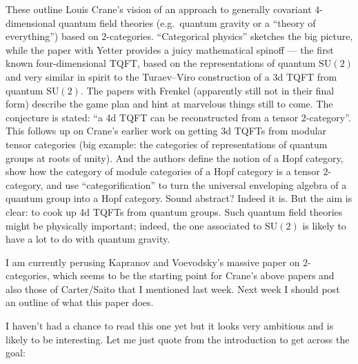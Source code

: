 \documentclass{article}
\def\tightlist{}
\renewcommand{\texttt}[1]{%
  \begingroup
  \ttfamily
  \begingroup\lccode`~=`/\lowercase{\endgroup\def~}{/\discretionary{}{}{}}%
  \begingroup\lccode`~=`[\lowercase{\endgroup\def~}{[\discretionary{}{}{}}%
  \begingroup\lccode`~=`.\lowercase{\endgroup\def~}{.\discretionary{}{}{}}%
  \catcode`/=\active\catcode`[=\active\catcode`.=\active
  \scantokens{#1\noexpand}%
  \endgroup
}
\begin{document}
These outline Louis Crane's vision of an approach to generally covariant
\(4\)-dimensional quantum field theories (e.g.~quantum gravity or a
``theory of everything'') based on \(2\)-categories. ``Categorical
physics'' sketches the big picture, while the paper with Yetter provides
a juicy mathematical spinoff --- the first known four-dimensional TQFT,
based on the representations of quantum \(\mathrm{SU}(2)\) and very
similar in spirit to the Turaev--Viro construction of a 3d TQFT from
quantum \(\mathrm{SU}(2)\). The papers with Frenkel (apparently still
not in their final form) describe the game plan and hint at marvelous
things still to come. The conjecture is stated: ``a 4d TQFT can be
reconstructed from a tensor \(2\)-category''. This follows up on Crane's
earlier work on getting 3d TQFTs from modular tensor categories (big
example: the categories of representations of quantum groups at roots of
unity). And the authors define the notion of a Hopf category, show how
the category of module categories of a Hopf category is a tensor
\(2\)-category, and use ``categorification'' to turn the universal
enveloping algebra of a quantum group into a Hopf category. Sound
abstract? Indeed it is. But the aim is clear: to cook up 4d TQFTs from
quantum groups. Such quantum field theories might be physically
important; indeed, the one associated to \(\mathrm{SU}(2)\) is likely to
have a lot to do with quantum gravity.

I am currently perusing Kapranov and Voevodsky's massive paper on
\(2\)-categories, which seems to be the starting point for Crane's above
papers and also those of Carter/Saito that I mentioned last week. Next
week I should post an outline of what this paper does.

\noindent
I haven't had a chance to read this one yet but it looks very ambitious
and is likely to be interesting. Let me just quote from the introduction
to get across the goal:
\end{document}
